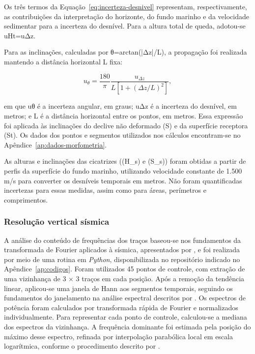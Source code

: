 Os três termos da Equação~\eqref{eq:incerteza-desnivel} representam, respectivamente, as contribuições da interpretação do horizonte, do fundo marinho e da velocidade sedimentar para a incerteza do desnível. Para a altura total de queda, adotou-se uHt=uΔz.

Para as inclinações, calculadas por θ=arctan(|Δz|/L), a propagação foi realizada mantendo a distância horizontal L fixa:

\begin{equation}
  u_\theta=\frac{180}{\pi}\frac{u_{\Delta z}}{L\left[1+(\Delta z/L)^2\right]},
  \label{eq:incerteza-inclinacao}
\end{equation}

\noindent
em que uθ é a incerteza angular, em graus; uΔz é a incerteza do desnível, em metros; e L é a distância horizontal entre os pontos, em metros. Essa expressão foi aplicada às inclinações do declive não deformado (S) e da superfície receptora (St). Os dados dos pontos e segmentos utilizados nos cálculos encontram-se no Apêndice~\ref{ap:dados-morfometria}.

As alturas e inclinações das cicatrizes ((H\_s) e (S\_s)) foram obtidas a partir de perfis da superfície do fundo marinho, utilizando velocidade constante de 1.500 m/s para converter os desníveis temporais em metros. Não foram quantificadas incertezas para essas medidas, assim como para áreas, perímetros e comprimentos.

\subsubsection{Resolução vertical sísmica}\label{sec:4-3-9-3}

A análise do conteúdo de frequências dos traços baseou-se nos fundamentos da transformada de Fourier aplicados à sísmica, apresentados por , e foi realizada por meio de uma rotina em \textit{Python}, disponibilizada no repositório indicado no Apêndice~\ref{ap:codigos}. Foram utilizados 45 pontos de controle, com extração de uma vizinhança de 3 × 3 traços em cada posição. Após a remoção da tendência linear, aplicou-se uma janela de Hann aos segmentos temporais, seguindo os fundamentos do janelamento na análise espectral descritos por . Os espectros de potência foram calculados por transformada rápida de Fourier e normalizados individualmente. Para representar cada ponto de controle, calculou-se a mediana dos espectros da vizinhança. A frequência dominante foi estimada pela posição do máximo desse espectro, refinada por interpolação parabólica local em escala logarítmica, conforme o procedimento descrito por .

